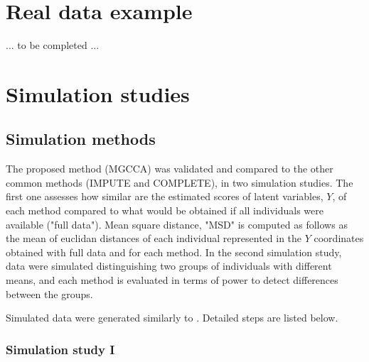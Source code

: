 \documentclass[article]{jss}
\begin{document}


\section{Real data example}

... to be completed ...


\section{Simulation studies}


\subsection{Simulation methods}

The proposed method (MGCCA) was validated and compared to the other common methods (IMPUTE and COMPLETE), in two simulation studies. 
The first one assesses how similar are the estimated scores of latent variables, $Y$, of each method compared to what would be obtained if all individuals were available ("full data"). Mean square distance, "MSD" is computed as follows as the mean of euclidan distances of each individual represented in the $Y$ coordinates obtained with full data and for each method.
In the second simulation study, data were simulated distinguishing two groups of individuals with different means, and each method is evaluated in terms of power to detect differences between the groups.

Simulated data were generated similarly to \cite{Velden:2006}. Detailed steps are listed below.

\subsubsection{Simulation study I}
\end{document}
